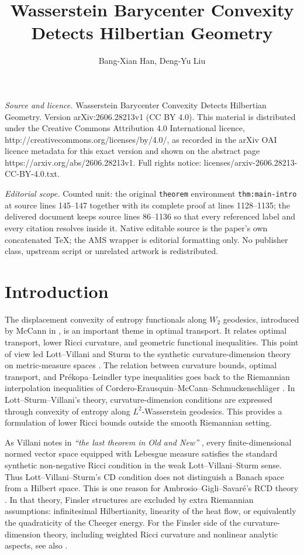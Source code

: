 \documentclass[10pt,a4paper]{amsart}
\numberwithin{equation}{section}
\begin{document}
\title[Wasserstein Barycenter Convexity Detects Hilbertian Geometry]{Wasserstein Barycenter Convexity Detects Hilbertian Geometry}
\author{Bang-Xian Han, Deng-Yu Liu}
\date{}
\maketitle
\noindent\emph{Source and licence.} Wasserstein Barycenter Convexity Detects Hilbertian Geometry. Version arXiv:2606.28213v1 (CC BY 4.0). This material is distributed under the Creative Commons Attribution 4.0 International licence, http://creativecommons.org/licenses/by/4.0/, as recorded in the arXiv OAI licence metadata for this exact version and shown on the abstract page https://arxiv.org/abs/2606.28213v1. Full rights notice: licenses/arxiv-2606.28213-CC-BY-4.0.txt.\par\smallskip
\noindent\textit{Editorial scope.} Counted unit: the original \texttt{theorem} environment \texttt{thm:main-intro} at source lines 145--147 together with its complete proof at lines 1128--1135; the delivered document keeps source lines 86--1136 so that every referenced label and every citation resolves inside it. Native editable source is the paper's own concatenated TeX; the AMS wrapper is editorial formatting only. No publisher class, upstream script or unrelated artwork is redistributed.
	\section{Introduction}\label{sec:introduction}
	The displacement convexity of entropy functionals along $W_2$ geodesics, introduced by McCann in \cite{McCann1997}, is an important theme in optimal transport. It relates optimal transport, lower Ricci curvature, and geometric functional inequalities. This point of view led Lott--Villani and Sturm to the synthetic curvature-dimension theory on metric-measure spaces \cite{LottVillani,SturmI,SturmII}. The relation between curvature bounds, optimal transport, and Pr\'ekopa--Leindler type inequalities goes back to the Riemannian interpolation inequalities of Cordero-Erausquin--McCann--Schmuckenschl\"ager \cite{CEMS,CEMS2006}.
	In Lott--Sturm--Villani's theory, curvature-dimension conditions are expressed through convexity of entropy along $L^2$-Wasserstein geodesics. This provides a formulation of lower Ricci bounds outside the smooth Riemannian setting.
	
	As Villani notes in \emph{``the last theorem in Old and New''} \cite[p.~926]{Villani2009}, every finite-dimensional normed vector space equipped with Lebesgue measure satisfies the standard synthetic non-negative Ricci condition in the weak Lott--Villani--Sturm sense. Thus  Lott--Villani--Sturm's $\mathrm{CD}$ condition  does not distinguish a Banach space from a Hilbert space. This is one reason for Ambrosio--Gigli--Savar\'e's \(\mathrm{RCD}\) theory \cite{AGS14,Gigli}. In that theory, Finsler structures are excluded by extra Riemannian assumptions: infinitesimal Hilbertianity, linearity of the heat flow, or equivalently the quadraticity of the Cheeger energy. For the Finsler side of the curvature-dimension theory, including weighted Ricci curvature and nonlinear analytic aspects, see also \cite{Ohta,Ohta2014,Ohta2017Survey,OhtaSturm2014}.
	
\end{document}
